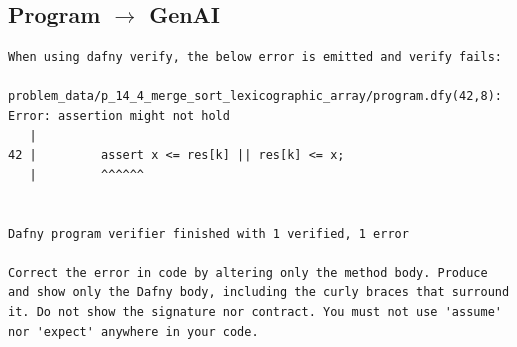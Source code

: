 \documentclass{article}
\begin{document}
\subsection*{Program $\rightarrow$ GenAI}
\begin{lstlisting}
When using dafny verify, the below error is emitted and verify fails:

problem_data/p_14_4_merge_sort_lexicographic_array/program.dfy(42,8): Error: assertion might not hold
   |
42 |         assert x <= res[k] || res[k] <= x;
   |         ^^^^^^


Dafny program verifier finished with 1 verified, 1 error

Correct the error in code by altering only the method body. Produce and show only the Dafny body, including the curly braces that surround it. Do not show the signature nor contract. You must not use 'assume' nor 'expect' anywhere in your code.
\end{lstlisting}
\end{document}

